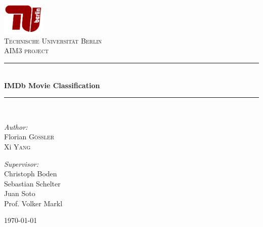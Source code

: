 \documentclass[pdftex,12pt,a4paper]{report}
\newcommand{\HRule}{\rule{\linewidth}{0.5mm}}
\begin{document}
\begin{titlepage} \begin{center}

\includegraphics[width=0.15\textwidth]{logo_tub.png}~\\[1cm]

\textsc{\LARGE Technische Universität Berlin}\\[1.5cm]

\textsc{\Large AIM3 project}\\[0.5cm]

\HRule \\[0.4cm] { \huge \bfseries IMDb Movie Classification \\[0.4cm] }

\HRule \\[1.5cm]

\noindent \begin{minipage}[t]{0.4\textwidth} \begin{flushleft} \large 
\emph{Author:}\\ Florian \textsc{Gößler} \\ Xi \textsc{Yang}\end{flushleft} \end{minipage}
% 
\begin{minipage}[t]{0.4\textwidth} \begin{flushright} \large 
\emph{Supervisor:} \\ Christoph Boden \\ Sebastian Schelter \\ Juan Soto \\ Prof. Volker Markl \end{flushright} \end{minipage}

\vfill

{\large \today}

\end{center} \end{titlepage}
\end{document}
